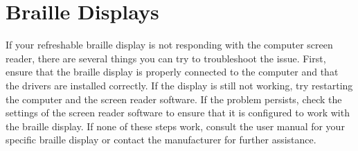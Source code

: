 \section{Braille Displays}\label{display2}
If your refreshable braille display is not responding with the computer screen reader, there are several things you can try to troubleshoot the issue. First, ensure that the braille display is properly connected to the computer and that the drivers are installed correctly. If the display is still not working, try restarting the computer and the screen reader software. If the problem persists, check the settings of the screen reader software to ensure that it is configured to work with the braille display. If none of these steps work, consult the user manual for your specific braille display or contact the manufacturer for further assistance.

